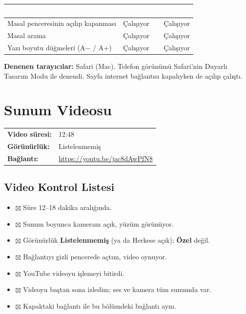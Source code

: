 \documentclass[12pt,a4paper]{article}
\newcommand{\youtubelink}{\url{https://youtu.be/jac8dAwPfN8}}
\begin{document}
\begin{center}
\begin{tabular}{@{}p{6cm}p{3.4cm}p{3.4cm}@{}}
\toprule
\rowcolor{ana}\textcolor{white}{\textbf{Özellik}} & \textcolor{white}{\textbf{Bilgisayar}} & \textcolor{white}{\textbf{Telefon}} \\
\midrule
\relax Masal penceresinin açılıp kapanması & Çalışıyor & Çalışıyor \\
\relax Masal arama & Çalışıyor & Çalışıyor \\
\relax Yazı boyutu düğmeleri (A$-$ / A+) & Çalışıyor & Çalışıyor \\
\bottomrule
\end{tabular}
\end{center}

\textbf{Denenen tarayıcılar:} Safari (Mac). Telefon görünümü Safari'nin Duyarlı Tasarım Modu ile denendi. Sayfa internet bağlantısı kapalıyken de açılıp çalıştı.

\section{Sunum Videosu}
\begin{center}
\begin{tabular}{@{}ll@{}}
\textbf{Video süresi:} & 12:48 \\
\textbf{Görünürlük:} & Listelenmemiş \\
\textbf{Bağlantı:} & \youtubelink \\
\end{tabular}
\end{center}

\subsection{Video Kontrol Listesi}
\begin{itemize}[label={}]
  \item $\boxtimes$ Süre 12--18 dakika aralığında.
  \item $\boxtimes$ Sunum boyunca kameram açık, yüzüm görünüyor.
  \item $\boxtimes$ Görünürlük \textbf{Listelenmemiş} (ya da Herkese açık); \textbf{Özel} değil.
  \item $\boxtimes$ Bağlantıyı gizli pencerede açtım, video oynuyor.
  \item $\boxtimes$ YouTube videoyu işlemeyi bitirdi.
  \item $\boxtimes$ Videoyu baştan sona izledim; ses ve kamera tüm sunumda var.
  \item $\boxtimes$ Kapaktaki bağlantı ile bu bölümdeki bağlantı aynı.
\end{itemize}
\end{document}
